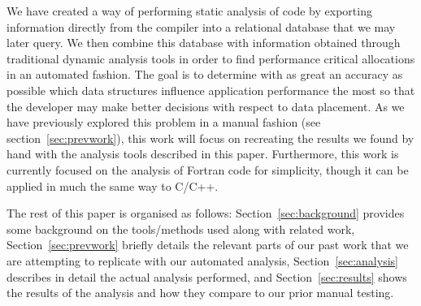 We have created a way of performing static analysis of code by exporting information directly from the compiler into a relational database that we may later query.
We then combine this database with information obtained through traditional dynamic analysis tools in order to find performance critical allocations in an automated fashion.
The goal is to determine with as great an accuracy as possible which data structures influence application performance the most so that the developer may make better decisions with respect to data placement.
As we have previously explored this problem in a manual fashion (see section~\ref{sec:prevwork})\cite{Doudali:2017:CTE:3132402.3132418}, this work will focus on recreating the results we found by hand with the analysis tools described in this paper.
Furthermore, this work is currently focused on the analysis of Fortran code for simplicity, though it can be applied in much the same way to C/C++.

The rest of this paper is organised as follows: Section~\ref{sec:background} provides some background on the tools/methods used along with related work, Section~\ref{sec:prevwork} briefly details the relevant parts of our past work that we are attempting to replicate with our automated analysis, Section~\ref{sec:analysis} describes in detail the actual analysis performed, and Section~\ref{sec:results} shows the results of the analysis and how they compare to our prior manual testing.%
